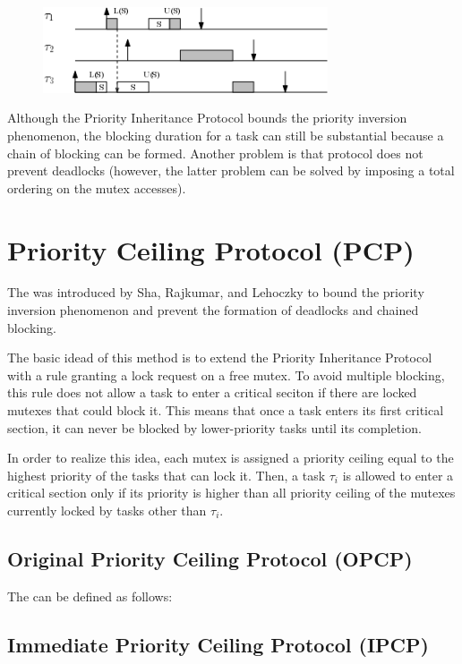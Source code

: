 \begin{figure}[!h]
    \centering
    \includegraphics[width =0.75\textwidth]{images/image09.png}
\end{figure}

Although the Priority Inheritance Protocol bounds the priority inversion phenomenon, the blocking duration for a task can still be substantial because a chain of blocking can be formed. Another problem is that protocol does not prevent deadlocks (however, the latter problem can be solved by imposing a total ordering on the mutex accesses).

\section{Priority Ceiling Protocol (PCP)} %
The  was introduced by Sha, Rajkumar, and Lehoczky to bound the priority inversion phenomenon and prevent the formation of deadlocks and chained blocking.

The basic idead of this method is to extend the Priority Inheritance Protocol with a rule granting a lock request on a free mutex. To avoid multiple blocking, this rule does not allow a task to enter a critical seciton if there are locked mutexes that could block it. This means that once a task enters its first critical section, it can never be blocked by lower-priority tasks until its completion.

In order to realize this idea, each mutex is assigned a priority ceiling equal to the highest priority of the tasks that can lock it. Then, a task $\tau_i$ is allowed to enter a critical section only if its priority is higher than all priority ceiling of the mutexes currently locked by tasks other than $\tau_i$.
\subsection{Original Priority Ceiling Protocol (OPCP)}

The  can be defined as follows:

\subsection{Immediate Priority Ceiling Protocol (IPCP)}